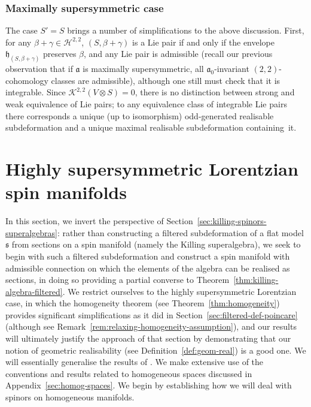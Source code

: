 \documentclass[pdftex]{sigma}
\numberwithin{equation}{section}
\newcommand{\fa}{\mathfrak{a}}
\newcommand{\fh}{\mathfrak{h}}
\newcommand{\fs}{\mathfrak{s}}
\newcommand{\cH}{\mathcal{H}}
\newcommand{\cK}{\mathcal{K}}
\newcommand{\1}{\mathbbm{1}}
\begin{document}
\subsubsection{Maximally supersymmetric case}

The case $S'=S$ brings a number of simplifications to the above discussion. First, for any $\beta+\gamma\in\cH^{2,2}$, $(S,\beta+\gamma)$ is a Lie pair if and only if the envelope $\fh_{(S,\beta+\gamma)}$ preserves $\beta$, and any Lie pair is admissible (recall our previous observation that if $\fa$ is maximally supersymmetric, all $\fa_0$-invariant $(2,2)$-cohomology classes are admissible), although one still must check that it is integrable. Since $\cK^{2,2}(V\otimes S)=0$, there is no distinction between strong and weak equivalence of Lie pairs; to any equivalence class of integrable Lie pairs there corresponds a unique (up to isomorphism) odd-generated realisable subdeformation and a unique maximal realisable subdeformation containing~it.

\section{Highly supersymmetric Lorentzian spin manifolds}
\label{sec:high-susy-spin-mfld}

In this section, we invert the perspective of Section~\ref{sec:killing-spinors-superalgebras}: rather than constructing a filtered subdeformation of a flat model $\fs$ from sections on a spin manifold (namely the Killing superalgebra), we seek to begin with such a filtered subdeformation and construct a spin manifold with admissible connection on which the elements of the algebra can be realised as sections, in doing so providing a partial converse to Theorem~\ref{thm:killing-algebra-filtered}. We restrict ourselves to the highly supersymmetric Lorentzian case, in which the homogeneity theorem (see Theorem~\ref{thm:homogeneity}) provides significant simplifications as it did in Section~\ref{sec:filtered-def-poincare} (although see Remark~\ref{rem:relaxing-homogeneity-assumption}), and our results will ultimately justify the approach of that section by demonstrating that our notion of geometric realisability (see Definition~\ref{def:geom-real}) is a good one. We will essentially generalise the results of \cite[Section~3.3]{Figueroa-OFarrill2017_1}. We make extensive use of the conventions and results related to homogeneous spaces discussed in Appendix~\ref{sec:homog-spaces}. We begin by establishing how we will deal with spinors on homogeneous manifolds.
\end{document}
